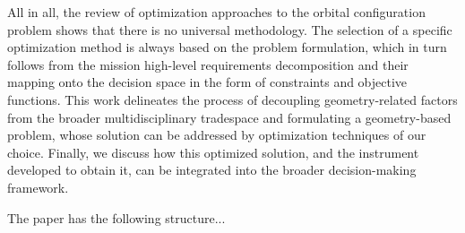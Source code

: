 All in all, the review of optimization approaches to the orbital configuration problem shows that there is no universal methodology. The selection of a specific optimization method is always based on the problem formulation, which in turn follows from the mission high-level requirements decomposition and their mapping onto the decision space in the form of constraints and objective functions. This work delineates the process of decoupling geometry-related factors from the broader multidisciplinary tradespace and formulating a geometry-based problem, whose solution can be addressed by optimization techniques of our choice. Finally, we discuss how this optimized solution, and the instrument developed to obtain it, can be integrated into the broader decision-making framework.

The paper has the following structure...